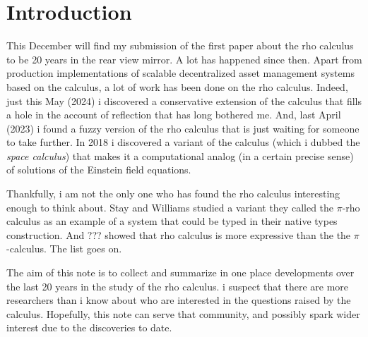 \section{Introduction}\label{sec:introduction} %
This December will find my submission of the first paper about the rho
calculus to be 20 years in the rear view mirror. A lot has happened
since then. Apart from production implementations of scalable
decentralized asset management systems based on the calculus, a lot of
work has been done on the rho calculus. Indeed, just this May (2024) i
discovered a conservative extension of the calculus that fills a hole
in the account of reflection that has long bothered me. And, last
April (2023) i found a fuzzy version of the rho calculus that is just
waiting for someone to take further. In 2018 i discovered a variant of
the calculus (which i dubbed the \emph{space calculus}) that makes it
a computational analog (in a certain precise sense) of solutions of
the Einstein field equations.

Thankfully, i am not the only one who has found the rho calculus
interesting enough to think about. Stay and Williams studied a variant
they called the $\pi$-rho calculus as an example of a system that could
be typed in their native types construction. And ??? showed that rho
calculus is more expressive than the the $\pi$-calculus. The list goes on.

The aim of this note is to collect and summarize in one place
developments over the last 20 years in the study of the rho calculus. i
suspect that there are more researchers than i know about who are
interested in the questions raised by the calculus. Hopefully, this
note can serve that community, and possibly spark wider interest due to
the discoveries to date.

